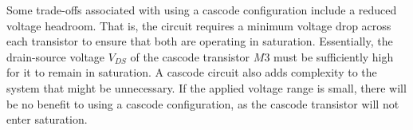 \documentclass[onecolumn]{article}
\begin{document}
Some trade-offs associated with using a cascode configuration include a reduced voltage headroom. That is, the circuit requires a minimum voltage drop across each transistor to ensure that both are operating in saturation. Essentially, the drain-source voltage $V_{DS}$ of the cascode transistor $M3$ must be sufficiently high for it to remain in saturation. A cascode circuit also adds complexity to the system that might be unnecessary. If the applied voltage range is small, there will be no benefit to using a cascode configuration, as the cascode transistor will not enter saturation.
\end{document}
